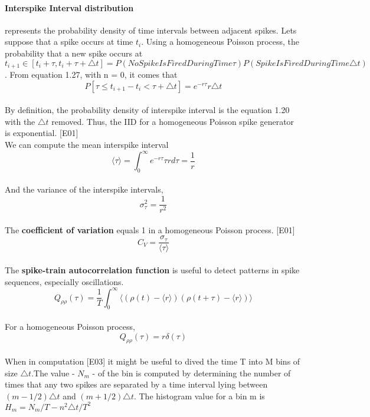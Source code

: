 \documentclass{report}
\begin{document}
\paragraph{Interspike Interval distribution } represents the probability density of time intervals between adjacent spikes. Lets suppose that a spike occurs at time $t_{i}$. Using a homogeneous Poisson process, the probability that a new spike occurs at $t_{i+1} \in [t_{i}+\tau,t_{i}+\tau+\triangle t] = P(No Spike Is Fired During Time \tau)P(Spike Is Fired During Time \triangle t)$. From equation 1.27, with n = 0, it comes that
\begin{equation}
P[\tau \leq t_{i+1}-t_{i}<\tau + \triangle t]=e^{-r\tau}r\triangle t
\end{equation}
\\By definition, the probability density of interspike interval is the equation 1.20 with the $\triangle t$ removed. Thus, the IID for a homogeneous Poisson spike generator is exponential. {\color{blue} [E01]}
\\We can compute the mean interspike interval
\begin{equation}
\langle \tau \rangle = \int_{0}^{\infty}e^{-r\tau}\tau r d\tau = \frac{1}{r}
\end{equation}
\\And the variance of the interspike intervals,
\begin{equation}
\sigma_{\tau}^{2}=\frac{1}{r^{2}}
\end{equation}
\\The \textbf{coefficient of variation} equals 1 in a homogeneous Poisson process. {\color{blue} [E01]}
\begin{equation}
C_{V} = \frac{\sigma_{\tau}}{\langle \tau \rangle}
\end{equation}
\\The \textbf{spike-train autocorrelation function} is useful to detect patterns in spike sequences, especially oscillations. 
\begin{equation}
Q_{\rho \rho}(\tau) = \frac{1}{T}\int_{0}^{\infty}\langle(\rho(t)-\langle r \rangle)(\rho(t+\tau)-\langle r \rangle)\rangle
\end{equation}
\\For a homogeneous Poisson process, 
\begin{equation}
Q_{\rho \rho}(\tau) = r\delta(\tau)
\end{equation}
\\When in computation {\color{blue} [E03]} it might be useful to dived the time T into M bins of size $\triangle t$.The value - $N_{m}$ - of the bin is computed by determining the number of times that any two spikes are separated by a time interval lying between $(m-1/2)\triangle t$ and $(m+1/2)\triangle t$. The histogram value for a bin m is $H_{m}=N_{m}/T -n^{2}\triangle t/T^{2}$
\end{document}
